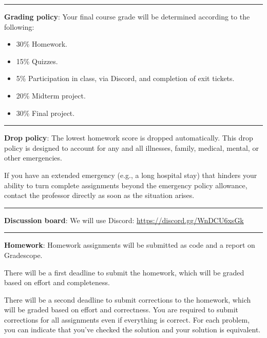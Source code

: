 \documentclass[12pt]{article}
\begin{document}
\begin{center}
  \rule{\textwidth}{0.5pt}
\end{center}

\noindent\textbf{Grading policy}: Your final course grade will be determined according to the following:
\begin{itemize}
  \item 30\% Homework.
  \item 15\% Quizzes.
  \item 5\% Participation in class, via Discord, and completion of exit tickets.
  \item 20\% Midterm project.
  \item 30\% Final project.
\end{itemize}

\begin{center}
  \rule{\textwidth}{0.5pt}
\end{center}

\noindent\textbf{Drop policy}: The lowest homework score is dropped automatically.
This drop policy is designed to account for any and all illnesses, family, medical, mental, or other emergencies.

If you have an extended emergency (e.g., a long hospital stay) that hinders your ability to turn complete assignments beyond the emergency policy allowance, contact the professor directly as soon as the situation arises.

\begin{center}
  \rule{\textwidth}{0.5pt}
\end{center}

\noindent\textbf{Discussion board}: We will use Discord: \href{https://discord.gg/WnDCU6xsGk}{https://discord.gg/WnDCU6xsGk}

\begin{center}
  \rule{\textwidth}{0.5pt}
\end{center}


\noindent\textbf{Homework}: Homework assignments will be submitted as code and a report on Gradescope.

There will be a first deadline to submit the homework, which will be graded based on effort and completeness.

There will be a second deadline to submit corrections to the homework, which will be graded based on effort and correctness.
You are required to submit corrections for all assignments even if everything is correct.
For each problem, you can indicate that you've checked the solution and your solution is equivalent.
\end{document}
